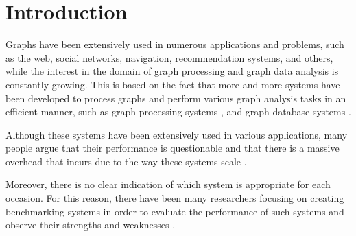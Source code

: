 \documentclass[a4paper,11pt]{article}
\begin{document}

\section{Introduction} \label{introduction}



\par Graphs have been extensively used in numerous applications and problems, such as the web, social networks, navigation, recommendation systems, and others, while the interest in the domain of graph processing and graph data analysis is constantly growing. This is based on the fact that more and more systems have been developed to process graphs and perform various graph analysis tasks in an efficient manner, such as graph processing systems \cite{naiad, timelydf,graphlab, flink, spark, graphxpaper, powergraph,pregel}, and graph database systems \cite{emptyheaded, neo4j, arangodb, orientdb}.

\par Although these systems have been extensively used in various applications, many people argue that their performance is questionable and that there is a massive overhead that incurs due to the way these systems scale \cite{case-against, scalability-cost, challenges}.

\par Moreover, there is no clear indication of which system is appropriate for each occasion. For this reason, there have been many researchers focusing on creating benchmarking systems in order to evaluate the performance of such systems and observe their strengths and weaknesses \cite{benchmarking-vision, how-well, graphalytics, traversal-benchmarking}.
\end{document}
